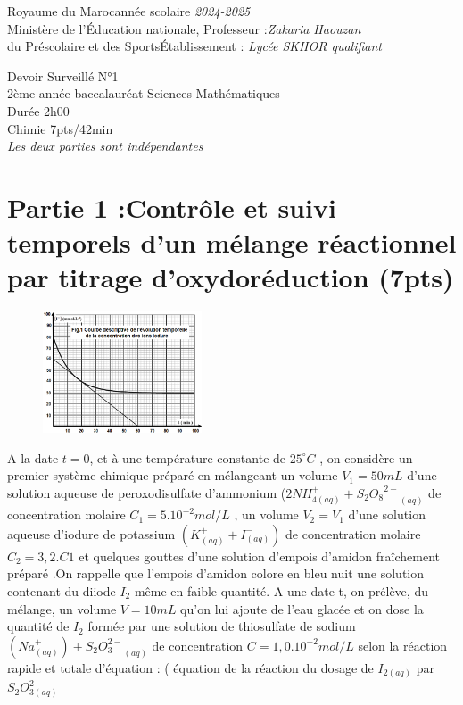 \documentclass[12pt]{article}
\newcommand\headerMe[2]{\noindent{}#1\hfill#2}
\begin{document}
\headerMe{Royaume du Maroc}{année scolaire \emph{2024-2025}}\\
\headerMe{Ministère de l'Éducation nationale, }{  Professeur :\emph{Zakaria Haouzan}}\\
\headerMe{du Préscolaire et des Sports}{Établissement : \emph{Lycée SKHOR qualifiant}}\\

\begin{center}
Devoir Surveillé  N°1 \\
    2ème année baccalauréat Sciences Mathématiques\\
Durée 2h00
\\
    \vspace{.2cm}
\hrulefill
\Large{Chimie 7pts/42min}
\hrulefill\\

    \emph{Les deux parties sont indépendantes}
\end{center}

 \section*{Partie 1 :Contrôle et suivi temporels d’un mélange réactionnel
par titrage d’oxydoréduction  \dotfill(7pts) }


\begin{figure}
	\vspace{-1cm}
\begin{center}
  \includegraphics[width=0.42\textwidth]{./img/chimie_00.png}
\end{center}
\end{figure}



A la date $t = 0$, et à une température constante de $25^{\circ}C$ , on considère un premier système chimique préparé
en mélangeant un volume $V_1 = 50 mL$ d’une solution aqueuse de peroxodisulfate d’ammonium ($2NH^+_{4(aq)} + {{S_2O_8}^{2-}}_{(aq)}$
de concentration molaire $C_1 = 5.10^{-2} mol/L$
, un volume $V_2 = V_1$ d’une solution aqueuse d’iodure de potassium $(K^+_{(aq)} + I^-_{(aq)})$ de concentration molaire
  $C_2 = 3,2.C1$ et quelques gouttes d’une solution d’empois d’amidon fraîchement
préparé .On rappelle que l’empois d’amidon colore en bleu nuit une solution contenant du diiode $I_2$ même en faible
quantité. A une date t, on prélève, du mélange, un volume $V = 10 mL$ qu’on lui ajoute de l’eau glacée et on dose la
quantité de $I_2$ formée par une solution de thiosulfate de sodium  $(Na^+_{(aq)}) + {S_2O_3^{2-}}_{(aq)}$  de concentration $C = 1,0.10^{-2}mol/L$
selon la réaction rapide et totale d’équation : ( équation de la réaction du dosage de $I_{2(aq)}$ par $S_2O_{3(aq)}^{2-}$
\end{document}

